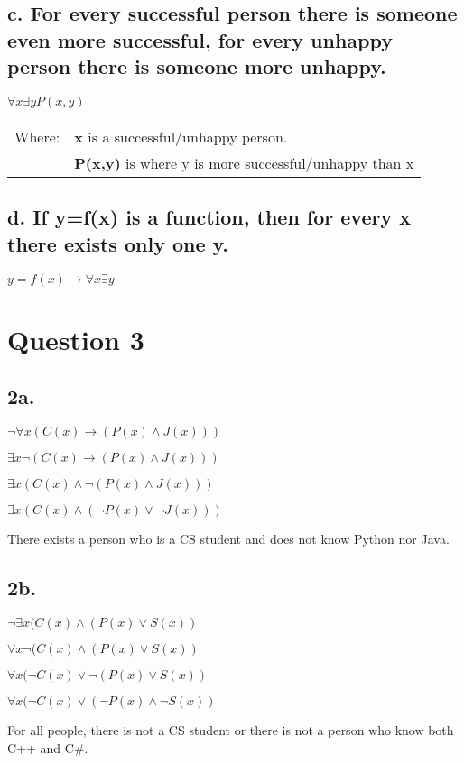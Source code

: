 \documentclass{article}
\begin{document}
\subsection*{c. For every successful person there is someone even more successful, for every unhappy person there is someone more unhappy.}

$\forall x \exists y P(x,y)$

\begin{tabular}{ll}
    Where: & \textbf{x} is a successful/unhappy person. \\
    & \textbf{P(x,y)} is where y is more successful/unhappy than x 
\end{tabular}

\subsection*{d. If y=f(x) is a function, then for every x there exists only one y.}
$ y = f(x) \rightarrow \forall x \exists y $

\section*{Question 3}
\subsection*{2a.}
$\neg \forall x (C(x) \rightarrow (P(x) \land J(x)))$

$\exists x \neg (C(x) \rightarrow (P(x) \land J(x)))$

$\exists x (C(x) \land \neg (P(x) \land J(x)))$

$\exists x (C(x) \land (\neg P(x) \lor \neg J(x)))$

There exists a person who is a CS student and does not know Python nor Java.

\subsection*{2b.}
$\neg \exists x (C(x) \land (P(x) \lor S(x))$

$\forall x \neg (C(x) \land (P(x) \lor S(x))$

$\forall x (\neg C(x) \lor \neg (P(x) \lor S(x))$

$\forall x (\neg C(x) \lor (\neg P(x) \land \neg S(x))$

For all people, there is not a CS student or there is not a person who know both C++ and C\#.
\end{document}
